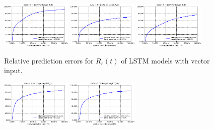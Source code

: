 \documentclass[sigconf]{acmart}
\begin{document}
	\begin{figure} 
		\includegraphics[width=0.3\textwidth]{fig4/data-3-ws10-task-1-7030-lstm.pdf}
		\includegraphics[width=0.3\textwidth]{fig4/data-3-ws20-task-1-7030-lstm.pdf}
		\includegraphics[width=0.3\textwidth]{fig4/data-3-ws50-task-1-7030-lstm.pdf}
		\caption{Relative prediction errors for $R_r(t)$ of LSTM models with vector input.}
		\label{fig:lstm-task1-vector}
	\end{figure}
	\begin{figure} 	
	\includegraphics[width=0.3\textwidth]{fig4/data-1-task-3-7030-lstm.pdf}
	\includegraphics[width=0.3\textwidth]{fig4/data-2-task-3-7030-lstm.pdf}
	\end{figure} 
\end{document}
